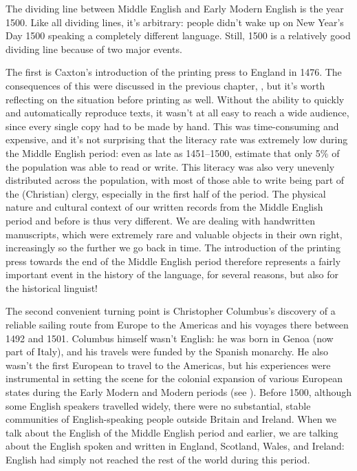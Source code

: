 The dividing line between Middle English and Early Modern English is the year 1500. Like all dividing lines, it's arbitrary: people didn't wake up on New Year's Day 1500 speaking a completely different language. Still, 1500 is a relatively good dividing line because of two major events.

The first is Caxton's introduction of the printing press to England in 1476. The consequences of this were discussed in the previous chapter, , but it's worth reflecting on the situation before printing as well. Without the ability to quickly and automatically reproduce texts, it wasn't at all easy to reach a wide audience, since every single copy had to be made by hand. This was time-consuming and expensive, and it's not surprising that the literacy rate was extremely low during the Middle English period: even as late as 1451--1500, \citet{BuringhVanZanden2009} estimate that only 5\% of the population was able to read or write. This literacy was also very unevenly distributed across the population, with most of those able to write being part of the (Christian) clergy, especially in the first half of the period. The physical nature and cultural context of our written records from the Middle English period and before is thus very different. We are dealing with handwritten manuscripts, which were extremely rare and valuable objects in their own right, increasingly so the further we go back in time. The introduction of the printing press towards the end of the Middle English period therefore represents a fairly important event in the history of the language, for several reasons, but also for the historical linguist!

\largerpage
The second convenient turning point is Christopher Columbus's discovery of a reliable sailing route from Europe to the Americas and his voyages there between 1492 and 1501. Columbus himself wasn't English: he was born in Genoa (now part of Italy), and his travels were funded by the Spanish monarchy. He also wasn't the first European to travel to the Americas, but his experiences were instrumental in setting the scene for the colonial expansion of various European states during the Early Modern and Modern periods (see ). Before 1500, although some English speakers travelled widely, there were no substantial, stable communities of English-speaking people outside Britain and Ireland. When we talk about the English of the Middle English period and earlier, we are talking about the English spoken and written in England, Scotland, Wales, and Ireland: English had simply not reached the rest of the world during this period.


